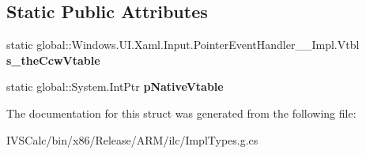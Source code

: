 \subsection*{Static Public Attributes}
\begin{DoxyCompactItemize}
\item 
\mbox{\label{struct_windows_1_1_u_i_1_1_xaml_1_1_input_1_1_pointer_event_handler_____impl_1_1_vtbl_a146a68e8d45876ff8c74606b7584e928}} 
static global\+::\+Windows.\+U\+I.\+Xaml.\+Input.\+Pointer\+Event\+Handler\+\_\+\+\_\+\+Impl.\+Vtbl {\bfseries s\+\_\+the\+Ccw\+Vtable}
\item 
\mbox{\label{struct_windows_1_1_u_i_1_1_xaml_1_1_input_1_1_pointer_event_handler_____impl_1_1_vtbl_a6f9361adcfcabdd2d4ab36023c22a625}} 
static global\+::\+System.\+Int\+Ptr {\bfseries p\+Native\+Vtable}
\end{DoxyCompactItemize}


The documentation for this struct was generated from the following file\+:\begin{DoxyCompactItemize}
\item 
I\+V\+S\+Calc/bin/x86/\+Release/\+A\+R\+M/ilc/Impl\+Types.\+g.\+cs\end{DoxyCompactItemize}
